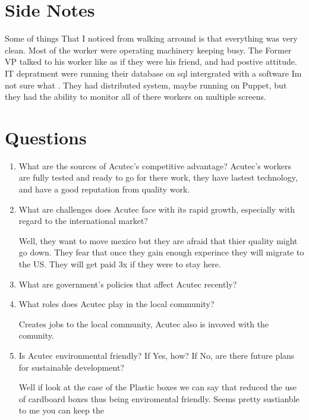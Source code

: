 \documentclass[12pt]{article}
\begin{document}
\section{Side Notes}                  
Some of things That I noticed from walking arround is that everything was very clean. Most of the worker were operating machinery keeping busy. The Former VP talked to his worker like as if they were his friend, and had postive attitude. IT depratment were running their database on sql intergrated with a software Im not sure what . They had distributed system, maybe running on Puppet, but they had the ability to monitor all of there workers on multiple  screens.                       
                
\section{Questions}
\begin{enumerate}
 \item What are the sources of Acutec’s competitive advantage?
Acutec's workers are fully tested and ready to go for there work, they have lastest technology, and have a good reputation from quality work.  
 
 \item What are challenges does Acutec face with its rapid growth, especially with regard to the
international market?

Well, they want to move mexico but they are afraid that thier quality might go down. They fear that once they gain enough experince they will migrate to the US. They will get paid 3x if they were to stay here.

 \item What are government’s policies that affect Acutec recently?
 
 
 
 
 \item What roles does Acutec play in the local community?

Creates jobs to the local community, Acutec also is invoved with the comunity.   
 
 
\item Is Acutec environmental friendly? If Yes, how? If No, are there future plans for sustainable
development? 

Well if look at the case of the Plastic boxes we can say that reduced the use of cardboard boxes thus being enviromental friendly. Seems pretty sustianble to me you can keep the 

\end{enumerate}

\newpage



\end{document}
